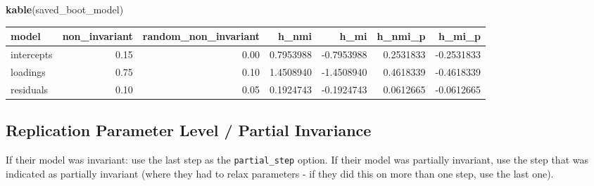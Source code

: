 \documentclass[
  english,
  man]{apa7}
\newenvironment{Shaded}{\begin{snugshade}}{\end{snugshade}}
\newcommand{\FunctionTok}[1]{\textcolor[rgb]{0.13,0.29,0.53}{\textbf{#1}}}
\newcommand{\NormalTok}[1]{#1}
\begin{document}
\begin{Shaded}
\begin{Highlighting}[]
\FunctionTok{kable}\NormalTok{(saved\_boot\_model)}
\end{Highlighting}
\end{Shaded}

\begin{tabular}{l|r|r|r|r|r|r}
\hline
model & non\_invariant & random\_non\_invariant & h\_nmi & h\_mi & h\_nmi\_p & h\_mi\_p\\
\hline
intercepts & 0.15 & 0.00 & 0.7953988 & -0.7953988 & 0.2531833 & -0.2531833\\
\hline
loadings & 0.75 & 0.10 & 1.4508940 & -1.4508940 & 0.4618339 & -0.4618339\\
\hline
residuals & 0.10 & 0.05 & 0.1924743 & -0.1924743 & 0.0612665 & -0.0612665\\
\hline
\end{tabular}

\subsection{Replication Parameter Level / Partial Invariance}\label{replication-parameter-level-partial-invariance}

If their model was invariant: use the last step as the \texttt{partial\_step} option. If their model was partially invariant, use the step that was indicated as partially invariant (where they had to relax parameters - if they did this on more than one step, use the last one).
\end{document}
